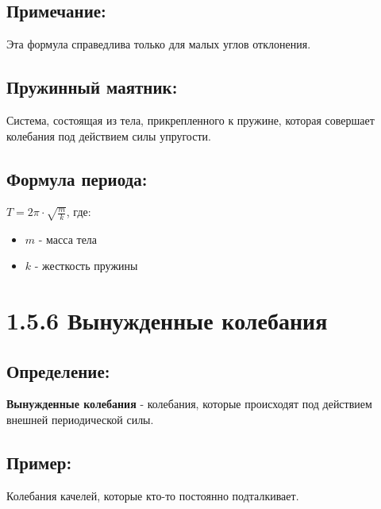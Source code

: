 \documentclass[a4paper,12pt]{article}
\begin{document}
\vspace{-9pt}
\subsection*{Примечание:}
\vspace{-3pt}
Эта формула справедлива только для малых углов отклонения.

\vspace{-9pt}
\subsection*{Пружинный маятник:}
\vspace{-3pt}
Система, состоящая из тела, прикрепленного к пружине, которая совершает колебания под действием силы упругости.

\vspace{-9pt}
\subsection*{Формула периода:}
\vspace{-3pt}
$T = 2\pi \cdot \sqrt{\frac{m}{k}}$, где:
\begin{itemize}[itemsep=0pt, topsep=0pt, parsep=0pt]
    \item $m$ - масса тела
    \item $k$ - жесткость пружины
\end{itemize}

\section*{1.5.6 Вынужденные колебания}

\vspace{-9pt}
\subsection*{Определение:}
\vspace{-3pt}
\textbf{Вынужденные колебания} - колебания, которые происходят под действием внешней периодической силы.

\vspace{-9pt}
\subsection*{Пример:}
\vspace{-3pt}
Колебания качелей, которые кто-то постоянно подталкивает.

\vspace{-9pt}
\end{document}

